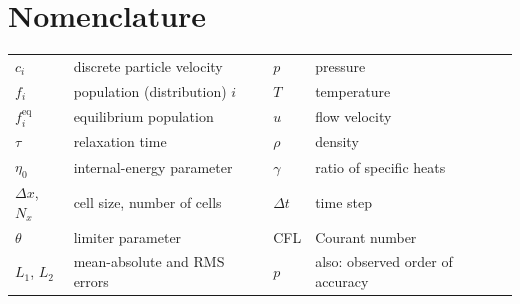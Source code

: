 \documentclass[11pt]{article}
\newcommand{\feq}{f^{\mathrm{eq}}}
\begin{document}
\section*{Nomenclature}
\begin{small}
\begin{tabularx}{\textwidth}{@{}l X l X@{}}
$c_i$ & discrete particle velocity & $p$ & pressure \\
$f_i$ & population (distribution) $i$ & $T$ & temperature \\
$\feq_i$ & equilibrium population & $u$ & flow velocity \\
$\tau$ & relaxation time & $\rho$ & density \\
$\eta_0$ & internal-energy parameter & $\gamma$ & ratio of specific heats \\
$\Delta x$, $N_x$ & cell size, number of cells & $\Delta t$ & time step \\
$\theta$ & limiter parameter & CFL & Courant number \\
$L_1$, $L_2$ & mean-absolute and RMS errors & $p$ & also: observed order of accuracy \\
\end{tabularx}
\end{small}
\end{document}
